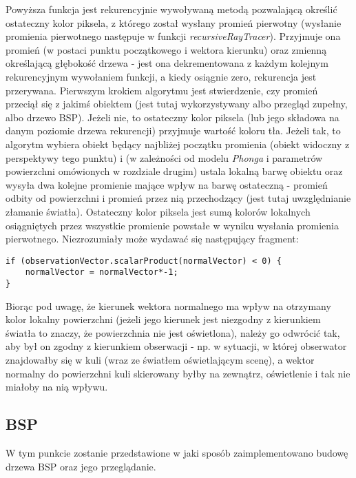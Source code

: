 Powyższa funkcja jest rekurencyjnie wywoływaną metodą pozwalającą określić ostateczny kolor piksela, z którego został wysłany promień pierwotny (wysłanie promienia pierwotnego następuje w funkcji \emph{recursiveRayTracer}). Przyjmuje ona promień (w postaci punktu początkowego i wektora kierunku) oraz zmienną określającą głębokość drzewa - jest ona dekrementowana z każdym kolejnym rekurencyjnym wywołaniem funkcji, a kiedy osiągnie zero, rekurencja jest przerywana. Pierwszym krokiem algorytmu jest stwierdzenie, czy promień przeciął się z jakimś obiektem (jest tutaj wykorzystywany albo przegląd zupełny, albo drzewo BSP). Jeżeli nie, to ostateczny kolor piksela (lub jego składowa na danym poziomie drzewa rekurencji) przyjmuje wartość koloru tła. Jeżeli tak, to algorytm wybiera obiekt będący najbliżej początku promienia (obiekt widoczny z perspektywy tego punktu) i (w zależności od modelu \emph{Phonga} i parametrów powierzchni omówionych w rozdziale drugim) ustala lokalną barwę obiektu oraz wysyła dwa kolejne promienie mające wpływ na barwę ostateczną - promień odbity od powierzchni i promień przez nią przechodzący (jest tutaj uwzględnianie złamanie światła).
Ostateczny kolor piksela jest sumą kolorów lokalnych osiągniętych przez wszystkie promienie powstałe w wyniku wysłania promienia pierwotnego.	Niezrozumiały może wydawać się następujący fragment:

\begin{lstlisting}[caption={}]
if (observationVector.scalarProduct(normalVector) < 0) {
    normalVector = normalVector*-1;
}
\end{lstlisting}

Biorąc pod uwagę, że kierunek wektora normalnego ma wpływ na otrzymany kolor lokalny powierzchni (jeżeli jego kierunek jest niezgodny z kierunkiem światła to znaczy, że powierzchnia nie jest oświetlona), należy go odwrócić tak, aby był on zgodny z kierunkiem obserwacji - np. w sytuacji, w której obserwator znajdowałby się w kuli (wraz ze światłem oświetlającym scenę), a wektor normalny do powierzchni kuli skierowany byłby na zewnątrz, oświetlenie i tak nie miałoby na nią wpływu.

\subsection{BSP}

W tym punkcie zostanie przedstawione w jaki sposób zaimplementowano budowę drzewa BSP oraz jego przeglądanie.

